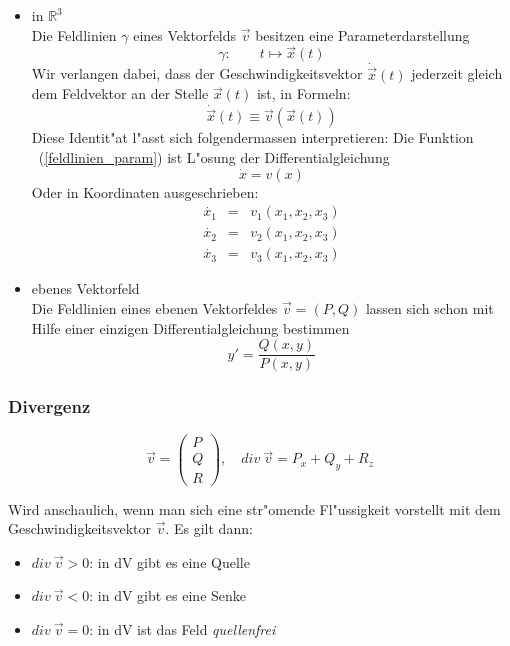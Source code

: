 \documentclass[10pt, a4paper, twocolumn]{scrartcl}
\begin{document}
\begin{itemize}
 \item in $\mathbb{R}^3$\\
  Die Feldlinien $\gamma$ eines Vektorfelds $\vec{v}$ besitzen eine Parameterdarstellung
  \begin{equation}
   \label{feldlinien_param}
   \gamma:\qquad t\mapsto \vec{x}(t)
  \end{equation}
  Wir verlangen dabei, dass der Geschwindigkeitsvektor $\dot{\vec{x}}(t)$ jederzeit gleich dem Feldvektor an der Stelle $\vec{x}(t)$ ist, in Formeln:
  $$\dot{\vec{x}}(t)\equiv\vec{v}(\vec{x}(t))$$
  Diese Identit"at l"asst sich folgendermassen interpretieren: Die Funktion ~(\ref{feldlinien_param}) ist L"osung der Differentialgleichung
  $$\dot{x}=v(x)$$
  Oder in Koordinaten ausgeschrieben:
  \begin{eqnarray}
   \dot{x_1} & = & v_1(x_1,x_2,x_3) \nonumber \\
   \dot{x_2} & = & v_2(x_1,x_2,x_3) \nonumber \\
   \dot{x_3} & = & v_3(x_1,x_2,x_3) \nonumber
  \end{eqnarray}
 \item ebenes Vektorfeld\\
  Die Feldlinien eines ebenen Vektorfeldes $\vec{v}=(P,Q)$ lassen sich schon mit Hilfe einer einzigen Differentialgleichung bestimmen
  $$y'=\frac{Q(x,y)}{P(x,y)}$$
\end{itemize}


\subsubsection{Divergenz}

$$\vec{v}=
\left (
\begin{array}{c}
 P\\
 Q\\
 R
\end{array}
\right ),\quad div\:\vec{v}= P_x + Q_y +R_z
$$

Wird anschaulich, wenn man sich eine str"omende Fl"ussigkeit vorstellt mit dem Geschwindigkeitsvektor $\vec{v}$. Es gilt dann:
\begin{itemize}
 \item $div\:\vec{v}> 0$: in dV gibt es eine Quelle
 \item $div\:\vec{v}< 0$: in dV gibt es eine Senke
 \item $div\:\vec{v}= 0$: in dV ist das Feld \textit{quellenfrei}
\end{itemize}
\end{document}
